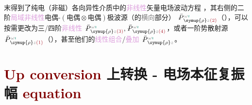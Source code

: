  末得到了\textcolor{PineGreen}{纯电（非磁）各向异性}介质中的\textcolor{Plum}{非线性}矢量电场波动方程 ，其右侧的二阶\textcolor{Plum}{局域}\textcolor{Plum}{非线性}\textcolor{NavyBlue}{电偶-$(\text{电偶}\otimes\text{电偶})$}极\textcolor{NavyBlue}{波源}（的\textcolor{gray}{横向}部分） $\xint{\mathcolor{gray}{-}}{25}{\bar{P}}^{\;\! \mathcolor{gray}{\omega} \textcolor{PineGreen}{\imath}}_{\;\! \symup{\rho} \mathcolor{gray}{z} \textcolor{Maroon}{(2)}}$（），可以按需更改为三/四阶\textcolor{Plum}{非线性} $\xint{\mathcolor{gray}{-}}{25}{\bar{P}}^{\;\! \mathcolor{gray}{\omega} \textcolor{PineGreen}{\imath}}_{\;\! \symup{\rho} \mathcolor{gray}{z} \textcolor{Maroon}{(3)}}, \xint{\mathcolor{gray}{-}}{25}{\bar{P}}^{\;\! \mathcolor{gray}{\omega} \textcolor{PineGreen}{\imath}}_{\;\! \symup{\rho} \mathcolor{gray}{z} \textcolor{Maroon}{(4)}}$，或者一阶\textcolor{NavyBlue}{势散射源} $\xint{\mathcolor{gray}{-}}{25}{\bar{P}}^{\;\! \mathcolor{gray}{\omega} \textcolor{PineGreen}{\imath}}_{\;\! \symup{\rho} \mathcolor{gray}{z} \textcolor{Maroon}{(1)}}$（），甚至他们的\textcolor{Plum}{线性组合}/\textcolor{Plum}{叠加} $\xint{\mathcolor{gray}{-}}{25}{\bar{P}}^{\;\! \mathcolor{gray}{\omega} \textcolor{PineGreen}{\imath}}_{\;\! \symup{\rho} \mathcolor{gray}{z}}$。

\section{\textcolor{Maroon}{Up conversion} 上转换 - 电场本征复振幅 \textcolor{Maroon}{equation}}\label{sec:up_convert}

